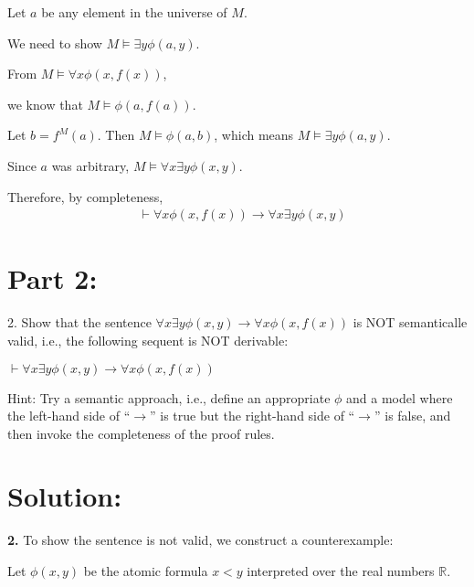 \documentclass{article}
\begin{document}
\vspace{1em}
Let $a$ be any element in the universe of $M$. 

We need to show $M \models \exists y \phi(a, y)$.

\vspace{1em}
From $M \models \forall x \phi(x, f(x))$, 

\vspace{1em}
we know that $M \models \phi(a, f(a))$.

\vspace{1em}
Let $b = f^M(a)$. Then $M \models \phi(a, b)$, which means $M \models \exists y \phi(a, y)$.

\vspace{1em}
Since $a$ was arbitrary, $M \models \forall x \exists y \phi(x, y)$.

\vspace{1em}
Therefore, by completeness, 
\[\begin{aligned}
    & \vdash \forall x \phi(x, f(x)) \rightarrow \forall x \exists y \phi(x, y)
\end{aligned}\]
\newpage


\section*{Part 2:}


\begin{mdframed}
    2. Show that the sentence $\forall x \exists y \phi(x, y) \rightarrow \forall x \phi(x, f (x))$ is NOT
    semanticalle valid, i.e., the following sequent is NOT derivable:
      \vspace{1em}
      
    $\vdash \forall x\exists y \phi(x, y) \rightarrow \forall x \phi(x, f (x))$
      \vspace{1em}
      
    Hint: Try a semantic approach, i.e., define an appropriate $\phi$ and a
    model where the left-hand side of “$\rightarrow$” is true but the right-hand side
    of “$\rightarrow$” is false, and then invoke the completeness of the proof rules.
\end{mdframed}
\section*{Solution:}
\textbf{2.} To show the sentence is not valid, we construct a counterexample:

\vspace{1em}
Let $\phi(x,y)$ be the atomic formula $x < y$ interpreted over the real numbers $\mathbb{R}$.
\end{document}
